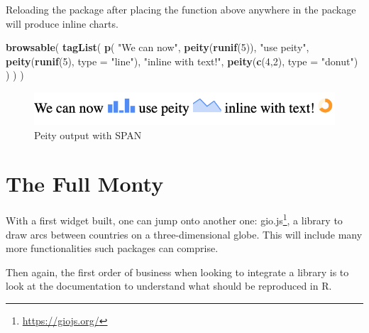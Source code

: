 \documentclass[
  10pt,
]{krantz}
\makeatletter
\newenvironment{Shaded}{\begin{snugshade}}{\end{snugshade}}
\newcommand{\DataTypeTok}[1]{\textcolor[rgb]{0.27,0.27,0.27}{#1}}
\newcommand{\DecValTok}[1]{\textcolor[rgb]{0.06,0.06,0.06}{#1}}
\newcommand{\KeywordTok}[1]{\textcolor[rgb]{0.27,0.27,0.27}{\textbf{#1}}}
\newcommand{\NormalTok}[1]{#1}
\newcommand{\StringTok}[1]{\textcolor[rgb]{0.5,0.5,0.5}{#1}}
\renewcommand{\href}[2]{#2\footnote{\url{#1}}}
\newenvironment{kframe}{%
\medskip{}
\setlength{\fboxsep}{.8em}
 \def\at@end@of@kframe{}%
 \ifinner\ifhmode%
  \def\at@end@of@kframe{\end{minipage}}%
  \begin{minipage}{\columnwidth}%
 \fi\fi%
 \def\FrameCommand##1{\hskip\@totalleftmargin \hskip-\fboxsep
 \colorbox{shadecolor}{##1}\hskip-\fboxsep
     \hskip-\linewidth \hskip-\@totalleftmargin \hskip\columnwidth}%
 \MakeFramed {\advance\hsize-\width
   \@totalleftmargin\z@ \linewidth\hsize
   \@setminipage}}%
 {\par\unskip\endMakeFramed%
 \at@end@of@kframe}
\renewenvironment{Shaded}{\begin{kframe}}{\end{kframe}}
\makeatother
\begin{document}
Reloading the package after placing the function above anywhere in the package will produce inline charts.

\begin{Shaded}
\begin{Highlighting}[]
\KeywordTok{browsable}\NormalTok{(}
  \KeywordTok{tagList}\NormalTok{(}
    \KeywordTok{p}\NormalTok{(}
      \StringTok{"We can now"}\NormalTok{, }\KeywordTok{peity}\NormalTok{(}\KeywordTok{runif}\NormalTok{(}\DecValTok{5}\NormalTok{)),}
      \StringTok{"use peity"}\NormalTok{, }\KeywordTok{peity}\NormalTok{(}\KeywordTok{runif}\NormalTok{(}\DecValTok{5}\NormalTok{), }\DataTypeTok{type =} \StringTok{"line"}\NormalTok{),}
      \StringTok{"inline with text!"}\NormalTok{,}
      \KeywordTok{peity}\NormalTok{(}\KeywordTok{c}\NormalTok{(}\DecValTok{4}\NormalTok{,}\DecValTok{2}\NormalTok{), }\DataTypeTok{type =} \StringTok{"donut"}\NormalTok{)}
\NormalTok{    )}
\NormalTok{  )}
\NormalTok{)}
\end{Highlighting}
\end{Shaded}

\begin{figure}[H]

{\centering \includegraphics[width=1\linewidth]{images/peity-span} 

}

\caption{Peity output with SPAN}\label{fig:peity-spans}
\end{figure}

\hypertarget{widgets-full}{%
\chapter{The Full Monty}\label{widgets-full}}

With a first widget built, one can jump onto another one: \href{https://giojs.org/}{gio.js}, a library to draw arcs between countries on a three-dimensional globe. This will include many more functionalities such packages can comprise.

Then again, the first order of business when looking to integrate a library is to look at the documentation to understand what should be reproduced in R.
\end{document}
